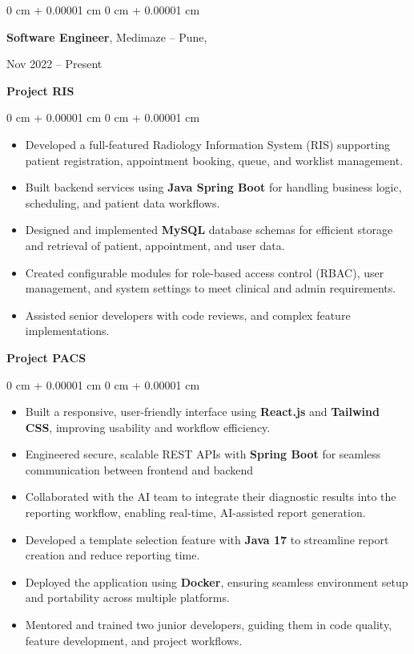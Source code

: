 \documentclass[10pt, letterpaper]{article}
\newenvironment{highlights}{
    \begin{itemize}[
        topsep=0.10 cm,
        parsep=0.10 cm,
        partopsep=0pt,
        itemsep=0pt,
        leftmargin=0 cm + 10pt
    ]
}{
    \end{itemize}
} %
\newenvironment{onecolentry}{
    \begin{adjustwidth}{
        0 cm + 0.00001 cm
    }{
        0 cm + 0.00001 cm
    }
}{
    \end{adjustwidth}
} %
\newenvironment{twocolentry}[2][]{
    \onecolentry
    \def\secondColumn{#2}
    \setcolumnwidth{\fill, 4.5 cm}
    \begin{paracol}{2}
}{
    \switchcolumn \raggedleft \secondColumn
    \end{paracol}
    \endonecolentry
} %
\begin{document}
        
        \begin{twocolentry}{
            Nov 2022 – Present
        }
            \textbf{Software Engineer}, Medimaze -- Pune,
            \end{twocolentry}
            \textbf{Project RIS}
            \vspace{0.10 cm}
    \begin{onecolentry}
        \begin{highlights}
            \item Developed a full-featured Radiology Information System (RIS) supporting patient registration, appointment booking, queue, and worklist management.  
            \item Built backend services using \textbf{Java Spring Boot} for handling business logic, scheduling, and patient data workflows.
            \item Designed and implemented \textbf{MySQL} database schemas for efficient storage and retrieval of patient, appointment, and user data.  
            \item Created configurable modules for role-based access control (RBAC), user management, and system settings to meet clinical and admin requirements.
            \item Assisted senior developers with code reviews, and complex feature implementations.
        \end{highlights}
    \end{onecolentry}
    \vspace{0.2 cm}
    
    \textbf{Project PACS}
    \vspace{0.10 cm}
    \begin{onecolentry}
        \begin{highlights}
             \item Built a responsive, user-friendly interface using \textbf{React.js} and \textbf{Tailwind CSS}, improving usability and workflow efficiency.
             \item Engineered secure, scalable REST APIs with \textbf{Spring Boot} for seamless communication between frontend and backend
             \item Collaborated with the AI team to integrate their diagnostic results into the reporting workflow, enabling real-time, AI-assisted report generation.
            \item Developed a template selection feature with \textbf{Java 17} to streamline report creation and reduce reporting time.  
            \item Deployed the application using \textbf{Docker}, ensuring seamless environment setup and portability across multiple platforms.
            \item Mentored and trained two junior developers, guiding them in code quality, feature development, and project workflows.
        \end{highlights}
    \end{onecolentry}
\end{document}

